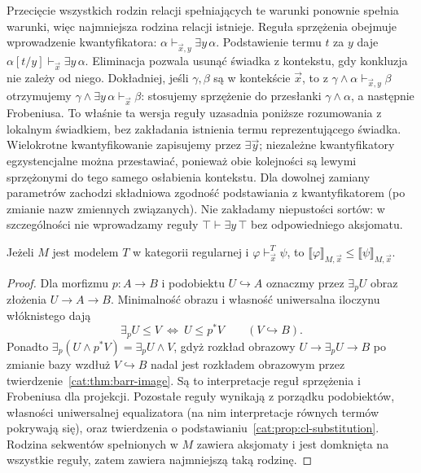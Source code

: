 Przecięcie wszystkich rodzin relacji spełniających te warunki ponownie spełnia warunki, więc najmniejsza rodzina relacji istnieje. Reguła sprzężenia obejmuje wprowadzenie kwantyfikatora: $\alpha\vdash_{\vec x,y}\exists y\,\alpha$. Podstawienie termu $t$ za $y$ daje $\alpha[t/y]\vdash_{\vec x}\exists y\,\alpha$. Eliminacja pozwala usunąć świadka z kontekstu, gdy konkluzja nie zależy od niego. Dokładniej, jeśli $\gamma,\beta$ są w kontekście $\vec x$, to z $\gamma\wedge\alpha\vdash_{\vec x,y}\beta$ otrzymujemy $\gamma\wedge\exists y\,\alpha\vdash_{\vec x}\beta$: stosujemy sprzężenie do przesłanki $\gamma\wedge\alpha$, a następnie Frobeniusa. To właśnie ta wersja reguły uzasadnia poniższe rozumowania z lokalnym świadkiem, bez zakładania istnienia termu reprezentującego świadka. Wielokrotne kwantyfikowanie zapisujemy przez $\exists\vec y$; niezależne kwantyfikatory egzystencjalne można przestawiać, ponieważ obie kolejności są lewymi sprzężonymi do tego samego osłabienia kontekstu. Dla dowolnej zamiany parametrów zachodzi składniowa zgodność podstawiania z kwantyfikatorem (po zmianie nazw zmiennych związanych). Nie zakładamy niepustości sortów: w szczególności nie wprowadzamy reguły $\top\vdash\exists y\,\top$ bez odpowiedniego aksjomatu.

\begin{stwierdzenie}\label{cat:prop:cl-deduction-sound}
Jeżeli $M$ jest modelem $T$ w kategorii regularnej i $\varphi\vdash^T_{\vec x}\psi$, to $\llbracket\varphi\rrbracket_{M,\vec x}\leq\llbracket\psi\rrbracket_{M,\vec x}$.
\end{stwierdzenie}
\begin{proof}
Dla morfizmu $p:A\to B$ i podobiektu $U\hookrightarrow A$ oznaczmy przez $\exists_p U$ obraz złożenia $U\to A\to B$. Minimalność obrazu i własność uniwersalna iloczynu włóknistego dają
\[
 \exists_p U\leq V\ \Longleftrightarrow\ U\leq p^*V
 \qquad(V\hookrightarrow B).
\]
Ponadto $\exists_p(U\wedge p^*V)=\exists_p U\wedge V$, gdyż rozkład obrazowy $U\to\exists_p U\to B$ po zmianie bazy wzdłuż $V\hookrightarrow B$ nadal jest rozkładem obrazowym przez twierdzenie~\ref{cat:thm:barr-image}. Są to interpretacje reguł sprzężenia i Frobeniusa dla projekcji. Pozostałe reguły wynikają z porządku podobiektów, własności uniwersalnej equalizatora (na nim interpretacje równych termów pokrywają się), oraz twierdzenia o podstawianiu~\ref{cat:prop:cl-substitution}. Rodzina sekwentów spełnionych w $M$ zawiera aksjomaty i jest domknięta na wszystkie reguły, zatem zawiera najmniejszą taką rodzinę.
\end{proof}

